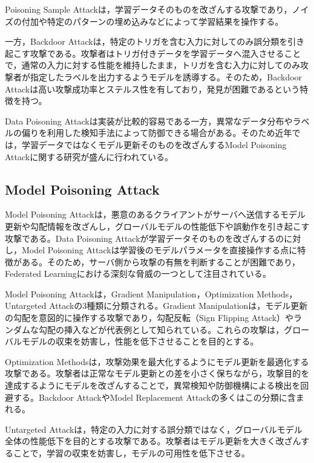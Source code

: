 \documentclass[a4j, twocolumn, dvipdfmx]{jsarticle}  %
\begin{document}
Poisoning Sample Attackは，学習データそのものを改ざんする攻撃であり，ノイズの付加や特定のパターンの埋め込みなどによって学習結果を操作する。

一方，Backdoor Attackは，特定のトリガを含む入力に対してのみ誤分類を引き起こす攻撃である。攻撃者はトリガ付きデータを学習データへ混入させることで，通常の入力に対する性能を維持したまま，トリガを含む入力に対してのみ攻撃者が指定したラベルを出力するようモデルを誘導する。そのため，Backdoor Attackは高い攻撃成功率とステルス性を有しており，発見が困難であるという特徴を持つ。

Data Poisoning Attackは実装が比較的容易である一方，異常なデータ分布やラベルの偏りを利用した検知手法によって防御できる場合がある。そのため近年では，学習データではなくモデル更新そのものを改ざんするModel Poisoning Attackに関する研究が盛んに行われている\cite{sagar2023survey}\cite{xie2020dba}\cite{nguyen2022flame}。



\subsection{Model Poisoning Attack}

Model Poisoning Attackは，悪意のあるクライアントがサーバへ送信するモデル更新や勾配情報を改ざんし，グローバルモデルの性能低下や誤動作を引き起こす攻撃である。Data Poisoning Attackが学習データそのものを改ざんするのに対し，Model Poisoning Attackは学習後のモデルパラメータを直接操作する点に特徴がある。そのため，サーバ側から攻撃の有無を判断することが困難であり，Federated Learningにおける深刻な脅威の一つとして注目されている\cite{sagar2023survey}。

Model Poisoning Attackは，Gradient Manipulation，Optimization Methods，Untargeted Attackの3種類に分類される\cite{sagar2023survey}。Gradient Manipulationは，モデル更新の勾配を意図的に操作する攻撃であり，勾配反転（Sign Flipping Attack）やランダムな勾配の挿入などが代表例として知られている。これらの攻撃は，グローバルモデルの収束を妨害し，性能を低下させることを目的とする。

Optimization Methodsは，攻撃効果を最大化するようにモデル更新を最適化する攻撃である。攻撃者は正常なモデル更新との差を小さく保ちながら，攻撃目的を達成するようにモデルを改ざんすることで，異常検知や防御機構による検出を回避する。Backdoor AttackやModel Replacement Attackの多くはこの分類に含まれる。

Untargeted Attackは，特定の入力に対する誤分類ではなく，グローバルモデル全体の性能低下を目的とする攻撃である。攻撃者はモデル更新を大きく改ざんすることで，学習の収束を妨害し，モデルの可用性を低下させる。
\end{document}

